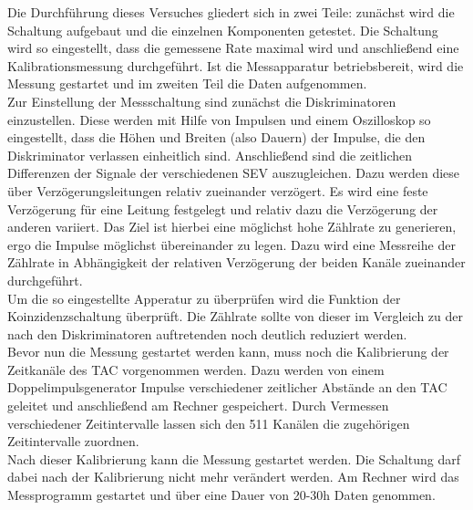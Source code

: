 Die Durchführung dieses Versuches gliedert sich in zwei Teile: zunächst wird die Schaltung aufgebaut und die einzelnen Komponenten getestet. Die Schaltung wird so eingestellt, dass die gemessene Rate maximal wird und anschließend eine Kalibrationsmessung durchgeführt. Ist die Messapparatur betriebsbereit, wird die Messung gestartet und im zweiten Teil die Daten aufgenommen. \\
Zur Einstellung der Messschaltung sind zunächst die Diskriminatoren einzustellen. Diese werden mit Hilfe von Impulsen und einem Oszilloskop so eingestellt, dass die Höhen und Breiten (also Dauern) der Impulse, die den Diskriminator verlassen einheitlich sind. Anschließend sind die zeitlichen Differenzen der Signale der verschiedenen SEV auszugleichen. Dazu werden diese über Verzögerungsleitungen relativ zueinander verzögert. Es wird eine feste Verzögerung für eine Leitung festgelegt und relativ dazu die Verzögerung der anderen variiert. Das Ziel ist hierbei eine möglichst hohe Zählrate zu generieren, ergo die Impulse möglichst übereinander zu legen. Dazu wird eine Messreihe der Zählrate in Abhängigkeit der relativen Verzögerung der beiden Kanäle zueinander durchgeführt. \\
Um die so eingestellte Apperatur zu überprüfen wird die Funktion der Koinzidenzschaltung überprüft. Die Zählrate sollte von dieser im Vergleich zu der nach den Diskriminatoren auftretenden noch deutlich reduziert werden. \\
Bevor nun die Messung gestartet werden kann, muss noch die Kalibrierung der Zeitkanäle des TAC vorgenommen werden. Dazu werden von einem Doppelimpulsgenerator Impulse verschiedener zeitlicher Abstände an den TAC geleitet und anschließend am Rechner gespeichert. Durch Vermessen verschiedener Zeitintervalle lassen sich den 511 Kanälen die zugehörigen Zeitintervalle zuordnen. \\
Nach dieser Kalibrierung kann die Messung gestartet werden. Die Schaltung darf dabei nach der Kalibrierung nicht mehr verändert werden. Am Rechner wird das Messprogramm gestartet und über eine Dauer von 20-30h Daten genommen.
